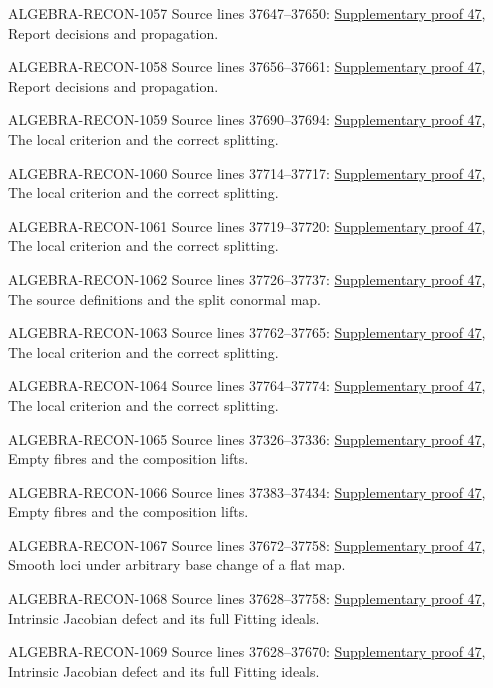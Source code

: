 \begin{AlgebraSourceRoutes}
\item[ALGEBRA-RECON-1057] Source lines 37647--37650: \hyperlink{algebra_smooth_notes_20260928}{Supplementary proof 47}, Report decisions and propagation.
\item[ALGEBRA-RECON-1058] Source lines 37656--37661: \hyperlink{algebra_smooth_notes_20260928}{Supplementary proof 47}, Report decisions and propagation.
\item[ALGEBRA-RECON-1059] Source lines 37690--37694: \hyperlink{algebra_smooth_notes_20260928}{Supplementary proof 47}, The local criterion and the correct splitting.
\item[ALGEBRA-RECON-1060] Source lines 37714--37717: \hyperlink{algebra_smooth_notes_20260928}{Supplementary proof 47}, The local criterion and the correct splitting.
\item[ALGEBRA-RECON-1061] Source lines 37719--37720: \hyperlink{algebra_smooth_notes_20260928}{Supplementary proof 47}, The local criterion and the correct splitting.
\item[ALGEBRA-RECON-1062] Source lines 37726--37737: \hyperlink{algebra_smooth_notes_20260928}{Supplementary proof 47}, The source definitions and the split conormal map.
\item[ALGEBRA-RECON-1063] Source lines 37762--37765: \hyperlink{algebra_smooth_notes_20260928}{Supplementary proof 47}, The local criterion and the correct splitting.
\item[ALGEBRA-RECON-1064] Source lines 37764--37774: \hyperlink{algebra_smooth_notes_20260928}{Supplementary proof 47}, The local criterion and the correct splitting.
\item[ALGEBRA-RECON-1065] Source lines 37326--37336: \hyperlink{algebra_smooth_notes_20260928}{Supplementary proof 47}, Empty fibres and the composition lifts.
\item[ALGEBRA-RECON-1066] Source lines 37383--37434: \hyperlink{algebra_smooth_notes_20260928}{Supplementary proof 47}, Empty fibres and the composition lifts.
\item[ALGEBRA-RECON-1067] Source lines 37672--37758: \hyperlink{algebra_smooth_notes_20260928}{Supplementary proof 47}, Smooth loci under arbitrary base change of a flat map.
\item[ALGEBRA-RECON-1068] Source lines 37628--37758: \hyperlink{algebra_smooth_notes_20260928}{Supplementary proof 47}, Intrinsic Jacobian defect and its full Fitting ideals.
\item[ALGEBRA-RECON-1069] Source lines 37628--37670: \hyperlink{algebra_smooth_notes_20260928}{Supplementary proof 47}, Intrinsic Jacobian defect and its full Fitting ideals.
\end{AlgebraSourceRoutes}

